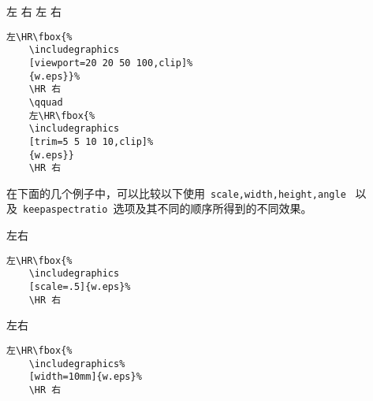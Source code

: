 \hspace{-1.5cm}\begin{minipage}[c]{.65\textwidth}
	左\HR\fbox{%
		\texttt{[image: w]}}%
	\HR 右
	\qquad
	左\HR\fbox{%
		\texttt{[image: w]}}%
	\HR 右
\end{minipage}%
\hspace{-1cm}\begin{minipage}[c]{.5\textwidth}
	\begin{Verbatim}[frame=lines,label=\colorbox{green}{\small 例二},labelposition=topline]
	左\HR\fbox{%
	\includegraphics
	[viewport=20 20 50 100,clip]%
	{w.eps}}%
	\HR 右
	\qquad
	左\HR\fbox{%
	\includegraphics
	[trim=5 5 10 10,clip]%
	{w.eps}}
	\HR 右
	\end{Verbatim}
	\par\vspace{0pt}
\end{minipage}
\fi

\noindent 在下面的几个例子中，可以比较以下使用~\texttt{scale,width,height,angle}~
以及~\texttt{keepaspectratio}~选项及其不同的顺序所得到的不同效果。

\begin{minipage}[t]{.45\textwidth}
	\vspace{0pt}
	左\HR\fbox{%
		\texttt{[image: w]}}\HR 右
\end{minipage}%
\hspace{-.5cm}\begin{minipage}[t]{.5\textwidth}
	\vspace{0pt}
	\begin{Verbatim}[frame=lines,label=\colorbox{green}{\small 例一},labelposition=topline]
	左\HR\fbox{%
	\includegraphics
	[scale=.5]{w.eps}%
	\HR 右
	\end{Verbatim}
\end{minipage}

\begin{minipage}[c]{.45\textwidth}
	左\HR\fbox{%
		\texttt{[image: w]}}\HR 右
\end{minipage}%
\hspace{-.5cm}\begin{minipage}[c]{.5\textwidth}
	\begin{Verbatim}[frame=lines,label=\colorbox{green}{\small 例二},labelposition=topline]
	左\HR\fbox{%
	\includegraphics%
	[width=10mm]{w.eps}%
	\HR 右
	\end{Verbatim}
\end{minipage}

